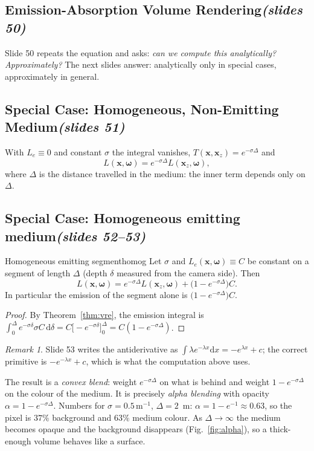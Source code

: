 \documentclass[11pt,a4paper]{article}
\newcommand{\slides}[1]{\texorpdfstring{\hfill{\normalfont\small\emph{(slides #1)}}}{ (slides #1)}}
\newcommand{\x}{\bm{x}}
\newcommand{\w}{\bm{\omega}}
\theoremstyle{remark}\newtheorem*{remark}{Remark}
\begin{document}
\subsection{Emission-Absorption Volume Rendering\slides{50}}

Slide 50 repeats the equation and asks: \emph{can we compute this analytically? Approximately?} The next slides answer: analytically only in special cases, approximately in general.

\subsection{Special Case: Homogeneous, Non-Emitting Medium\slides{51}}

With $L_e\equiv0$ and constant $\sigma$ the integral vanishes, $T(\x,\x_z)=e^{-\sigma\Delta}$ and
\[
L(\x,\w)=e^{-\sigma\Delta}L(\x_z,\w),
\]
where $\Delta$ is the distance travelled in the medium: the inner term depends only on $\Delta$.

\subsection{Special Case: Homogeneous emitting medium\slides{52--53}}

\begin{lemma}{Homogeneous emitting segment}{homog}
Let $\sigma$ and $L_e(\x,\w)\equiv C$ be constant on a segment of length $\Delta$ (depth $\delta$ measured from the camera side). Then
\[
L(\x,\w)=e^{-\sigma\Delta}L(\x_z,\w)+\bigl(1-e^{-\sigma\Delta}\bigr)C .
\]
In particular the emission of the segment alone is $\bigl(1-e^{-\sigma\Delta}\bigr)C$.
\end{lemma}
\begin{proof}
By Theorem~\ref{thm:vre}, the emission integral is $\int_0^\Delta e^{-\sigma\delta}\sigma C\,\mathrm d\delta=C\bigl[-e^{-\sigma\delta}\bigr]_0^\Delta=C(1-e^{-\sigma\Delta})$.
\end{proof}

\begin{remark}
Slide 53 writes the antiderivative as $\int\lambda e^{-\lambda x}\mathrm dx=-e^{\lambda x}+c$; the correct primitive is $-e^{-\lambda x}+c$, which is what the computation above uses.
\end{remark}

\begin{intuition}
The result is a \emph{convex blend}: weight $e^{-\sigma\Delta}$ on what is behind and weight $1-e^{-\sigma\Delta}$ on the colour of the medium. It is precisely \emph{alpha blending} with opacity $\alpha=1-e^{-\sigma\Delta}$. Numbers for $\sigma=0.5\,\mathrm m^{-1}$, $\Delta=2$~m: $\alpha=1-e^{-1}\approx0.63$, so the pixel is $37\%$ background and $63\%$ medium colour. As $\Delta\to\infty$ the medium becomes opaque and the background disappears (Fig.~\ref{fig:alpha}), so a thick-enough volume behaves like a surface.
\end{intuition}
\end{document}
